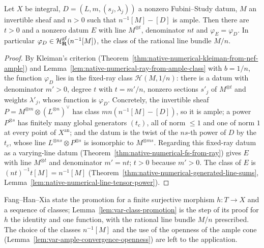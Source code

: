 \begin{lemma}
\label{lem:var-class-promotion}
\leanok
{}
Let $X$ be integral, $D=(L,m,(s_j,\lambda_j))$ a nonzero Fubini--Study datum, $M$ an invertible
sheaf and $n>0$ such that $n^{-1}[M]-[D]$ is ample. Then there are $t>0$ and a nonzero datum $E$
with line $M^{\otimes t}$, denominator $nt$ and $\varphi_E=\varphi_D$. In particular
$\varphi_D\in\mathcal H^{\mathrm{gf}}_{\mathbf{R}}(n^{-1}[M])$, the class of the rational line bundle $M/n$.
\end{lemma}
\begin{proof}
By Kleiman's criterion (Theorem~\ref{thm:native-numerical-kleiman-from-nef-ample}) and
Lemma~\ref{lem:native-numerical-ray-from-ample-class} with $b=1/n$, the function $\varphi_D$
lies in the fixed-ray class $\mathcal H(M,1/n)$: there is a datum with denominator $m'>0$, degree
$t$ with $t=m'/n$, nonzero sections $s'_j$ of $M^{\otimes t}$ and weights $\lambda'_j$, whose
function is $\varphi_D$. Concretely, the invertible sheaf
$P=M^{\otimes m}\otimes(L^{\otimes n})^\vee$ has class $mn(n^{-1}[M]-[D])$, so it is ample;
a power $P^{\otimes s}$ has finitely many global generators $(t_c)$, all of norm $\le1$ and one
of norm $1$ at every point of $X^{\mathrm{an}}$; and the datum is the twist of the $ns$-th power
of $D$ by the $t_c$, whose line $L^{\otimes ns}\otimes P^{\otimes s}$ is isomorphic to
$M^{\otimes ms}$. Regarding this fixed-ray datum as a varying-line datum
(Theorem~\ref{thm:native-numerical-fs-from-ray}) gives $E$ with line $M^{\otimes t}$ and
denominator $m'=nt$; $t>0$ because $m'>0$. The class of $E$ is
$(nt)^{-1}t[M]=n^{-1}[M]$ (Theorem~\ref{thm:native-numerical-generated-line-sums},
Lemma~\ref{lem:native-numerical-line-tensor-power}).
\end{proof}

\begin{remark}
\label{rmk:var-class-promotion-source}
Fang--Han--Xia state the promotion for a finite surjective morphism $h:T\to X$ and a sequence
of classes; Lemma~\ref{lem:var-class-promotion} is the step of its proof for $h$ the identity
and one function, with the rational line bundle $M/n$ prescribed. The choice of the classes
$n^{-1}[M]$ and the use of the openness of the ample cone
(Lemma~\ref{lem:var-ample-convergence-openness}) are left to the application.
\end{remark}

